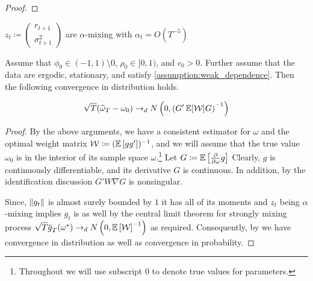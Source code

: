 \documentclass[11pt, letterpaper, twoside, final]{article}
\begin{document}
\begin{appendices}
\begin{proof}
\end{proof}


\begin{assump}
    \label{assumption:weak_dependence}
    $z_t \coloneqq \begin{pmatrix} r_{t+1} \\ \sigma^2_{t+1} \end{pmatrix}$ are $\alpha$-mixing with $\alpha_t =
       O\left(T^{-5}\right)$
\end{assump}


\begin{theorem}
    Assume that $\phi_0  \in (-1,1) \setminus 0$, $\rho_0 \in [0,1)$, and $c_0 > 0$. 
    Further assume that the data are ergodic, stationary, and satisfy \cref{assumption:weak_dependence}.
    Then the following convergence in distribution holds.

    \begin{equation}
    \sqrt{T} (\widehat{\omega}_T - \omega_0) \dto \N\left(0, \left(G' \E[\W] G\right)^{-1}\right)
    \end{equation}
\end{theorem}

\begin{proof}

    By the above arguments, we have a consistent estimator for $\omega$ and the optimal weight matrix $\W \coloneqq
    (\E\left[g g'\right])^{-1}$, and we will assume that the true value $\omega_{0}$ is in the interior of its
    sample space $\omega$.\footnote{Throughout we will use subscript \num{0}  to denote true values for parameters.}
    Let $G \coloneqq \E\left[\frac{\partial}{\partial \omega} \popmom \right]$ Clearly, $g$ is continuously
    differentiable, and its derivative $G$ is continuous.
    In addition, by the identification discussion $G' W \nabla G$ is nonsingular.
    

    Since, $\norm*{g_t}$ is almost surely bounded by $1$ it has all of its moments and $z_t$ being $\alpha$-mixing
    implies $g_t$ is as well by the central limit theorem for strongly mixing process $\sqrt{T} \sampmom(\omega^{*})
    \dto \N\left(0, \E\left[\W\right]^{-1}\right)$ as required. 
    Consequently, by \textcite[theorem 3.2]{newey1994large} we have convergence in distribution as well as
    convergence in probability.
    


\end{proof}
\end{appendices}
\end{document}
